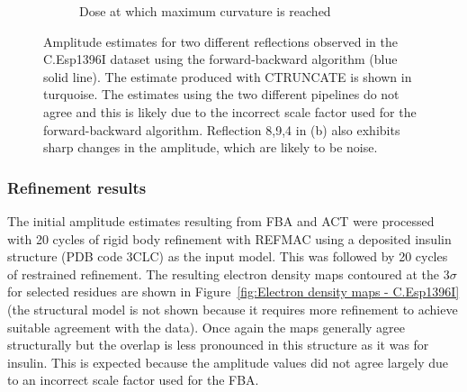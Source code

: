 \begin{figure}
\begin{subfigure}[b]{1.0\textwidth}
            \caption{Dose at which maximum curvature is reached}
            \label{fig:Amplitude estimates ref 8,9,4 - C.Esp1396I}
    \end{subfigure}
    \caption{Amplitude estimates for two different reflections observed in the C.Esp1396I dataset using the forward-backward algorithm (blue solid line).
    The estimate produced with CTRUNCATE is shown in turquoise.
    The estimates using the two different pipelines do not agree and this is likely due to the incorrect scale factor used for the forward-backward algorithm.
    Reflection 8,9,4 in (b) also exhibits sharp changes in the amplitude, which are likely to be noise.}
    \label{fig:Amplitude estimates - C.Esp1396I}
\end{figure}

\subsubsection{Refinement results}
\label{subs:Refinement results - C.Esp1396I}
The initial amplitude estimates resulting from FBA and ACT were processed with 20 cycles of rigid body refinement with REFMAC \cite{murshudov2011refmac5} using a deposited insulin structure (PDB code 3CLC) as the input model.
This was followed by 20 cycles of restrained refinement.
The resulting electron density maps contoured at the 3$\sigma$ for selected residues are shown in Figure~\ref{fig:Electron density maps - C.Esp1396I} (the structural model is not shown because it requires more refinement to achieve suitable agreement with the data).
Once again the maps generally agree structurally but the overlap is less pronounced in this structure as it was for insulin.
This is expected because the amplitude values did not agree largely due to an incorrect scale factor used for the FBA.
